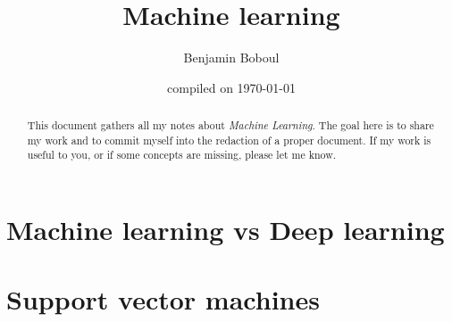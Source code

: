 \documentclass{report}
\title{Machine learning}
\author{Benjamin Boboul}
\date{compiled on \today}
\begin{document}
	\maketitle

	\begin{abstract}
	This document gathers all my notes about \textit{Machine Learning}. The goal here is to share my work and to commit myself into the redaction of a proper document. If my work is useful to you, or if some concepts are missing, please let me know.
	\end{abstract}

	\chapter{Machine learning vs Deep learning}
	

	\chapter{Support vector machines}
	

	\printglossaries
\end{document}
